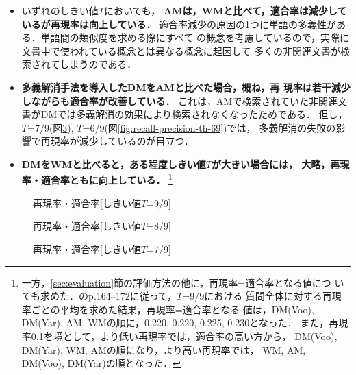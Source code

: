 \begin{itemize}
\item いずれのしきい値$T$においても，
{\dg\bf AMは，WMと比べて，適合率は減少しているが再現率は向上している．}
適合率減少の原因の1つに単語の多義性がある．単語間の類似度を求める際にすべて
の概念を考慮しているので，実際に文書中で使われている概念とは異なる概念に起因して
多くの非関連文書が検索されてしまうのである．

\item  {\dg\bf 多義解消手法を導入したDMをAMと比べた場合，概ね，再
    現率は若干減少しながらも適合率が改善している．} 
  これは，AMで検索されていた非関連文書がDMでは多義解消の効果により検索されなくなったためである．
但し，$T$=7/9(図\ref{fig:recall-precision-th-79}), 
$T$=6/9(図\ref{fig:recall-precision-th-69})では，
多義解消の失敗の影響で再現率が減少しているのが目立つ．

\item  {\dg\bf DMをWMと比べると，ある程度しきい値$T$が大きい場合には，
大略，再現率・適合率ともに向上している．}
\footnote{
一方，\ref{sec:evaluation}節の評価方法の他に，再現率=適合率となる値につ
      いても求めた．\cite{Salton83a}のp.164--172に従って，$T$=9/9における
      質問全体に対する再現率ごとの平均を求めた結果，再現率=適合率となる
      値は，DM(Voo), DM(Yar), AM, WMの順に，0.220, 0.220, 0.225, 0.230となった．
      また，再現率0.1を境として，より低い再現率では，適合率の高い方から，
      DM(Voo), DM(Yar), WM, AMの順になり，より高い再現率では，
      WM, AM, DM(Voo), DM(Yar)の順となった．}
\end{itemize}

\clearpage

\begin{figure}[ht]
 
 \centerline{}
 \caption{再現率・適合率[しきい値$T$=9/9]}
 \label{fig:recall-precision-th-99}
\end{figure}

\begin{figure}
 
 \centerline{}
 \caption{再現率・適合率[しきい値$T$=8/9]}
 \label{fig:recall-precision-th-89}
\end{figure}

\begin{figure}
 
 \centerline{}
 \caption{再現率・適合率[しきい値$T$=7/9]}
 \label{fig:recall-precision-th-79}
\end{figure}


